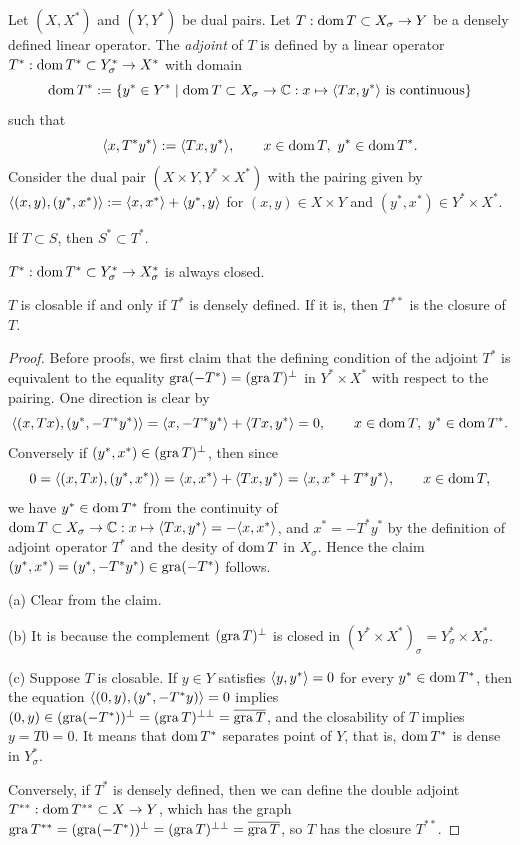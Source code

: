 \documentclass{../../large}
\begin{document}
\begin{prb}
Let $(X,X^*)$ and $(Y,Y^*)$ be dual pairs.
Let $T:\operatorname{dom} T\subset X_\sigma\to Y$ be a densely defined linear operator.
The \emph{adjoint} of $T$ is defined by a linear operator $T^*:\operatorname{dom} T^*\subset Y^*_\sigma\to X^*$ with domain
\[\operatorname{dom} T^*:=\{y^*\in Y^*\mid \operatorname{dom} T\subset X_\sigma\to\mathbb{C}:x\mapsto\langle Tx,y^*\rangle\text{ is continuous}\}\]
such that
\[\langle x,T^*y^*\rangle:=\langle Tx,y^*\rangle,\qquad x\in\operatorname{dom} T,\ y^*\in\operatorname{dom} T^*.\]
Consider the dual pair $(X\times Y,Y^*\times X^*)$ with the pairing given by $\langle(x,y),(y^*,x^*)\rangle:=\langle x,x^*\rangle+\langle y^*,y\rangle$ for $(x,y)\in X\times Y$ and $(y^*,x^*)\in Y^*\times X^*$.




\begin{parts}
\item If $T\subset S$, then $S^*\subset T^*$.
\item $T^*:\operatorname{dom} T^*\subset Y^*_\sigma\to X^*_\sigma$ is always closed.
\item $T$ is closable if and only if $T^*$ is densely defined. If it is, then $T^{**}$ is the closure of $T$.
\end{parts}
\end{prb}
\begin{proof}
Before proofs, we first claim that the defining condition of the adjoint $T^*$ is equivalent to the equality $\operatorname{gra}(-T^*)=(\operatorname{gra} T)^\perp$ in $Y^*\times X^*$ with respect to the pairing.
One direction is clear by
\[\langle(x,Tx),(y^*,-T^*y^*)\rangle=\langle x,-T^*y^*\rangle+\langle Tx,y^*\rangle=0,\qquad x\in\operatorname{dom} T,\ y^*\in\operatorname{dom} T^*.\]
Conversely if $(y^*,x^*)\in(\operatorname{gra} T)^\perp$, then since
\[0=\langle(x,Tx),(y^*,x^*)\rangle=\langle x,x^*\rangle+\langle Tx,y^*\rangle=\langle x,x^*+T^*y^*\rangle,\qquad x\in\operatorname{dom} T,\]
we have $y^*\in\operatorname{dom} T^*$ from the continuity of $\operatorname{dom} T\subset X_\sigma\to\mathbb{C}:x\mapsto\langle Tx,y^*\rangle=-\langle x,x^*\rangle$, and $x^*=-T^*y^*$ by the definition of adjoint operator $T^*$ and the desity of $\operatorname{dom} T$ in $X_\sigma$.
Hence the claim $(y^*,x^*)=(y^*,-T^*y^*)\in\operatorname{gra}(-T^*)$ follows.

(a) Clear from the claim.

(b) It is because the complement $(\operatorname{gra} T)^\perp$ is closed in $(Y^*\times X^*)_\sigma=Y^*_\sigma\times X^*_\sigma$.

(c)
Suppose $T$ is closable.
If $y\in Y$ satisfies $\langle y,y^*\rangle=0$ for every $y^*\in\operatorname{dom} T^*$, then the equation $\langle(0,y),(y^*,-T^*y)\rangle=0$ implies $(0,y)\in(\operatorname{gra}(-T^*))^\perp=(\operatorname{gra} T)^{\perp\perp}=\overline{\operatorname{gra} T}$, and the closability of $T$ implies $y=T0=0$.
It means that $\operatorname{dom} T^*$ separates point of $Y$, that is, $\operatorname{dom} T^*$ is dense in $Y^*_\sigma$.

Conversely, if $T^*$ is densely defined, then we can define the double adjoint $T^{**}:\operatorname{dom} T^{**}\subset X\to Y$, which has the graph $\operatorname{gra} T^{**}=(\operatorname{gra}(-T^*))^\perp=(\operatorname{gra} T)^{\perp\perp}=\overline{\operatorname{gra} T}$, so $T$ has the closure $T^{**}$.

\end{proof}
\end{document}
